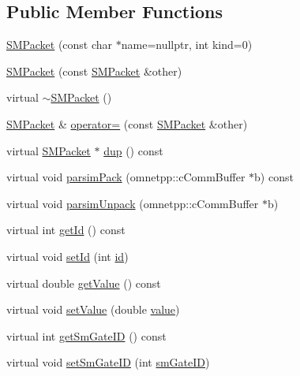 \subsection*{Public Member Functions}
\begin{DoxyCompactItemize}
\item 
\hyperlink{classsmart3p_1_1SMPacket_a096748da42a5fce6a6947268987c1a62}{S\+M\+Packet} (const char $\ast$name=nullptr, int kind=0)
\item 
\hyperlink{classsmart3p_1_1SMPacket_ab998efe53cce923572c1ca4d147fef57}{S\+M\+Packet} (const \hyperlink{classsmart3p_1_1SMPacket}{S\+M\+Packet} \&other)
\item 
virtual \hyperlink{classsmart3p_1_1SMPacket_ab5e176e11c65abb458f17f75ccad4344}{$\sim$\+S\+M\+Packet} ()
\item 
\hyperlink{classsmart3p_1_1SMPacket}{S\+M\+Packet} \& \hyperlink{classsmart3p_1_1SMPacket_a9f61efd109fbd0c599a9fd07309392f4}{operator=} (const \hyperlink{classsmart3p_1_1SMPacket}{S\+M\+Packet} \&other)
\item 
virtual \hyperlink{classsmart3p_1_1SMPacket}{S\+M\+Packet} $\ast$ \hyperlink{classsmart3p_1_1SMPacket_a94d4fe6ad55564e56212f96d9b65e346}{dup} () const
\item 
virtual void \hyperlink{classsmart3p_1_1SMPacket_a68dbbbae28db832e790118a6f55c662b}{parsim\+Pack} (omnetpp\+::c\+Comm\+Buffer $\ast$b) const
\item 
virtual void \hyperlink{classsmart3p_1_1SMPacket_a758324526341dcbd38b8bdb21327b1e2}{parsim\+Unpack} (omnetpp\+::c\+Comm\+Buffer $\ast$b)
\item 
virtual int \hyperlink{classsmart3p_1_1SMPacket_a4c1e98a2f81acc1addcae93531e72af1}{get\+Id} () const
\item 
virtual void \hyperlink{classsmart3p_1_1SMPacket_a9ba1e3a6882f264a5c26598db65f2c16}{set\+Id} (int \hyperlink{classsmart3p_1_1SMPacket_af0612d8448370b8919ff415b860725ed}{id})
\item 
virtual double \hyperlink{classsmart3p_1_1SMPacket_a4278cf44eab393e432f284f8e846c602}{get\+Value} () const
\item 
virtual void \hyperlink{classsmart3p_1_1SMPacket_a19a0aa3959661f34bc16de6411e46daa}{set\+Value} (double \hyperlink{classsmart3p_1_1SMPacket_aa5596bff5a9720c59788a6766357c8d9}{value})
\item 
virtual int \hyperlink{classsmart3p_1_1SMPacket_a157ffd9338082090b11995f78e863e0d}{get\+Sm\+Gate\+ID} () const
\item 
virtual void \hyperlink{classsmart3p_1_1SMPacket_ad29377a4b1e784290e99c4bf538fbeef}{set\+Sm\+Gate\+ID} (int \hyperlink{classsmart3p_1_1SMPacket_a12d57198d78f1b58b027aba4a99cdc3b}{sm\+Gate\+ID})

\end{DoxyCompactItemize}
